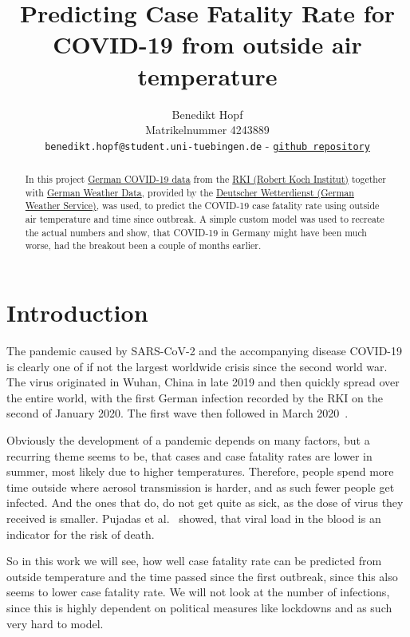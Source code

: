 \documentclass{article}
\title{Predicting Case Fatality Rate for COVID-19 from outside air temperature}
\author{%
  Benedikt Hopf\\
  Matrikelnummer 4243889\\
  \texttt{benedikt.hopf@student.uni-tuebingen.de} - \href{https://github.com/benedikthopf/DataLit-COVID-CFR-from-temperature}{\texttt{github repository}} \\
}
\begin{document}
\maketitle

\begin{abstract}

  In this project \href{https://www.arcgis.com/sharing/rest/content/items/f10774f1c63e40168479a1feb6c7ca74/data}{German COVID-19 data} from the \href{https://www.rki.de/DE/Home/homepage_node.html}{RKI (Robert Koch Institut)} together with \href{https://opendata.dwd.de/climate_environment/CDC/observations_germany/climate/hourly/air_temperature/}{German Weather Data}, provided by the \href{https://www.dwd.de/DE/Home/home_node.html}{Deutscher Wetterdienst (German Weather Service)}, was used, to predict the COVID-19 case fatality rate using outside air temperature and time since outbreak. A simple custom model was used to recreate the actual numbers and show, that COVID-19 in Germany might have been much worse, had the breakout been a couple of months earlier.

\end{abstract}

\section{Introduction}
\label{sec:introduction}

The pandemic caused by SARS-CoV-2 and the accompanying disease COVID-19 is clearly one of if not the largest worldwide crisis since the second world war. The virus originated in Wuhan, China in late 2019 and then quickly spread over the entire world, with the first German infection recorded by the RKI on the second of January 2020. The first wave then followed in March 2020~\cite{rki_2022}.  

Obviously the development of a pandemic depends on many factors, but a recurring theme seems to be, that cases and case fatality rates are lower in summer, most likely due to higher temperatures. Therefore, people spend more time outside where aerosol transmission is harder, and as such fewer people get infected. And the ones that do, do not get quite as sick, as the dose of virus they received is smaller. Pujadas et al.~\cite{pujadas_chaudhry_mcbride_richter_zhao_wajnberg_nadkarni_glicksberg_houldsworth_cordon-cardo_et_al._2020} showed, that viral load in the blood is an indicator for the risk of death.

So in this work we will see, how well case fatality rate can be predicted from outside temperature and the time passed since the first outbreak, since this also seems to lower case fatality rate. We will not look at the number of infections, since this is highly dependent on political measures like lockdowns and as such very hard to model. 
\end{document}
